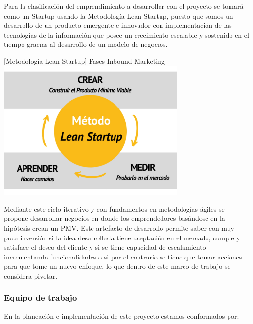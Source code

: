 Para la clasificación del emprendimiento a desarrollar con el proyecto se tomará como un Startup usando la Metodología Lean Startup, puesto que somos un desarrollo de un producto emergente e innovador con implementación de las tecnologías de la información que posee un crecimiento escalable y sostenido en el tiempo gracias al desarrollo de un modelo de negocios.

\vspace{2mm}
        \begin{minipage}{0.9\textwidth}
        \centering
        [{Metodología Lean Startup}]{ Fases Inbound Marketing  }
        \label{leanStartUp}
         \includegraphics[width=0.7\textwidth]{Images/Infografía-fases-metodología-Lean-Startup.jpg}
\end{minipage}

Mediante este ciclo iterativo y con fundamentos en metodologías ágiles se propone desarrollar negocios en donde los emprendedores basándose en la hipótesis crean un PMV. Este artefacto de desarrollo permite saber con muy poca inversión si la idea desarrollada tiene aceptación en el mercado, cumple y satisface el deseo del cliente y si se tiene capacidad de escalamiento
incrementando funcionalidades o si por el contrario se tiene que tomar acciones para que tome un nuevo enfoque, lo que dentro de este marco de trabajo se considera pivotar.

\subsubsection*{Equipo de trabajo}
En la planeación e implementación de este proyecto estamos conformados por:

